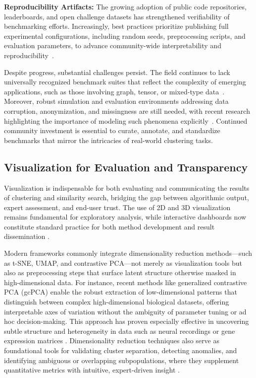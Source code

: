 \documentclass[sigconf]{acmart}
\begin{document}
\textbf{Reproducibility Artifacts:} The growing adoption of public code repositories, leaderboards, and open challenge datasets has strengthened verifiability of benchmarking efforts. Increasingly, best practices prioritize publishing full experimental configurations, including random seeds, preprocessing scripts, and evaluation parameters, to advance community-wide interpretability and reproducibility~\cite{ref14, ref44, ref64, ref80, ref81, ref91, ref95, ref99}.

Despite progress, substantial challenges persist. The field continues to lack universally recognized benchmark suites that reflect the complexity of emerging applications, such as those involving graph, tensor, or mixed-type data~\cite{ref27, ref28, ref36, ref46, ref110}. Moreover, robust simulation and evaluation environments addressing data corruption, anonymization, and missingness are still needed, with recent research highlighting the importance of modeling such phenomena explicitly~\cite{ref94, ref95, ref96, ref99}. Continued community investment is essential to curate, annotate, and standardize benchmarks that mirror the intricacies of real-world clustering tasks.

\subsection{Visualization for Evaluation and Transparency}

Visualization is indispensable for both evaluating and communicating the results of clustering and similarity search, bridging the gap between algorithmic output, expert assessment, and end-user trust. The use of 2D and 3D visualization remains fundamental for exploratory analysis, while interactive dashboards now constitute standard practice for both method development and result dissemination \cite{ref53,ref58,ref79,ref86,ref91,ref92,ref94,ref95,ref99,ref115}.

Modern frameworks commonly integrate dimensionality reduction methods---such as t-SNE, UMAP, and contrastive PCA---not merely as visualization tools but also as preprocessing steps that surface latent structure otherwise masked in high-dimensional data. For instance, recent methods like generalized contrastive PCA (gcPCA) enable the robust extraction of low-dimensional patterns that distinguish between complex high-dimensional biological datasets, offering interpretable axes of variation without the ambiguity of parameter tuning or ad hoc decision-making. This approach has proven especially effective in uncovering subtle structure and heterogeneity in data such as neural recordings or gene expression matrices \cite{ref99}. Dimensionality reduction techniques also serve as foundational tools for validating cluster separation, detecting anomalies, and identifying ambiguous or overlapping subpopulations, where they supplement quantitative metrics with intuitive, expert-driven insight \cite{ref58,ref92,ref94,ref95}.
\end{document}
